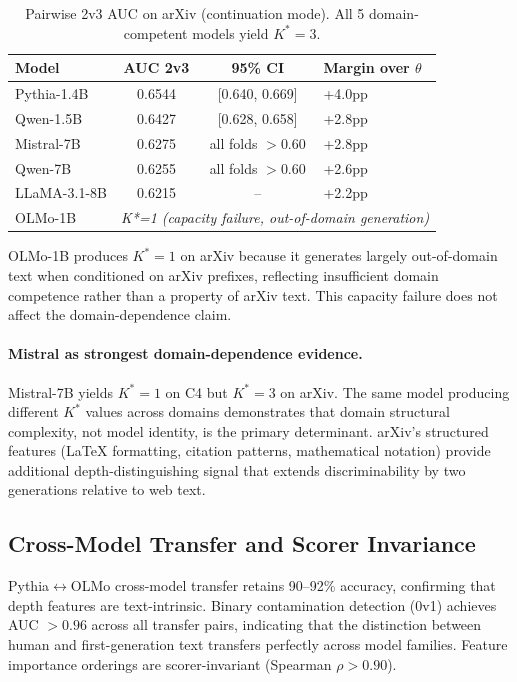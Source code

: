 \documentclass[11pt]{article}
\begin{document}
\begin{table}[t]
\centering
\caption{Pairwise 2v3 AUC on arXiv (continuation mode). All 5 domain-competent models yield $K^*{=}3$.}
\label{tab:arxiv-kstar}
\small
\begin{tabular}{lccl}
\toprule
Model & AUC 2v3 & 95\% CI & Margin over $\theta$ \\
\midrule
Pythia-1.4B & 0.6544 & [0.640, 0.669] & +4.0pp \\
Qwen-1.5B & 0.6427 & [0.628, 0.658] & +2.8pp \\
Mistral-7B & 0.6275 & all folds $>0.60$ & +2.8pp \\
Qwen-7B & 0.6255 & all folds $>0.60$ & +2.6pp \\
LLaMA-3.1-8B & 0.6215 & -- & +2.2pp \\
\midrule
OLMo-1B & \multicolumn{3}{l}{\textit{K*=1 (capacity failure, out-of-domain generation)}} \\
\bottomrule
\end{tabular}
\end{table}

OLMo-1B produces $K^*{=}1$ on arXiv because it generates largely out-of-domain text when conditioned on arXiv prefixes, reflecting insufficient domain competence rather than a property of arXiv text. This capacity failure does not affect the domain-dependence claim.

\paragraph{Mistral as strongest domain-dependence evidence.} Mistral-7B yields $K^*{=}1$ on C4 but $K^*{=}3$ on arXiv. The same model producing different $K^*$ values across domains demonstrates that domain structural complexity, not model identity, is the primary determinant. arXiv's structured features (LaTeX formatting, citation patterns, mathematical notation) provide additional depth-distinguishing signal that extends discriminability by two generations relative to web text.

\subsection{Cross-Model Transfer and Scorer Invariance}

Pythia$\leftrightarrow$OLMo cross-model transfer retains 90--92\% accuracy, confirming that depth features are text-intrinsic. Binary contamination detection (0v1) achieves AUC $> 0.96$ across all transfer pairs, indicating that the distinction between human and first-generation text transfers perfectly across model families. Feature importance orderings are scorer-invariant (Spearman $\rho > 0.90$).
\end{document}
